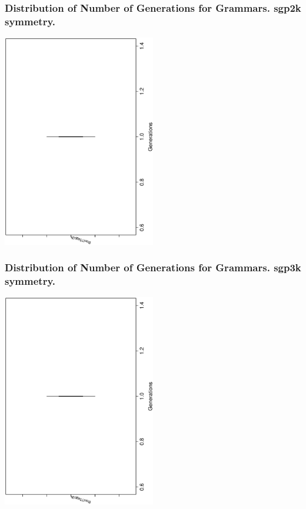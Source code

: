 \documentclass[18pt,c]{beamer}
\begin{document}
 \begin{frame}
 \frametitle{ Distribution of Number of Generations for Grammars. sgp2k  symmetry. }
 \begin{center}
\includegraphics[width=0.5\textwidth, angle=-90]
{ExpFboxplottGenerations000.eps}
 \end{center}
 \label{ExpFboxplottGenerations000.eps}  
 \end{frame}

 \begin{frame}
 \frametitle{ Distribution of Number of Generations for Grammars. sgp3k  symmetry. }
 \begin{center}
\includegraphics[width=0.5\textwidth, angle=-90]
{ExpFboxplottGenerations001.eps}
 \end{center}
 \label{ExpFboxplottGenerations001.eps}  
 \end{frame}
\end{document}
